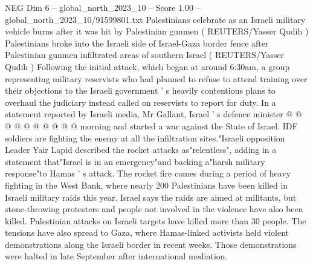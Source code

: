 \begin{textsample}{NEG Dim 6 – global\_north\_2023\_10 – Score 1.00 – global\_north\_2023\_10/91599801.txt}
Palestinians celebrate as an Israeli military vehicle burns after it was hit by Palestinian gunmen ( REUTERS/Yasser Qudih ) Palestinians broke into the Israeli side of Israel-Gaza border fence after Palestinian gunmen infiltrated areas of southern Israel ( REUTERS/Yasser Qudih ) Following the initial attack, which began at around 6:30am, a group representing military reservists who had planned to refuse to attend training over their objections to the Israeli government ' s heavily contentious plans to overhaul the judiciary instead called on reservists to report for duty.
In a statement reported by Israeli media, Mr Gallant, Israel ' s defence minister @ @ @ @ @ @ @ @ @ @ morning and started a war against the State of Israel.
IDF soldiers are fighting the enemy at all the infiltration sites."Israeli opposition Leader Yair Lapid described the rocket attacks as"relentless", adding in a statement that"Israel is in an emergency"and backing a"harsh military response"to Hamas ' s attack.
The rocket fire comes during a period of heavy fighting in the West Bank, where nearly 200 Palestinians have been killed in Israeli military raids this year.
Israel says the raids are aimed at militants, but stone-throwing protesters and people not involved in the violence have also been killed.
Palestinian attacks on Israeli targets have killed more than 30 people.
The tensions have also spread to Gaza, where Hamas-linked activists held violent demonstrations along the Israeli border in recent weeks.
Those demonstrations were halted in late September after international mediation.

\end{textsample}
